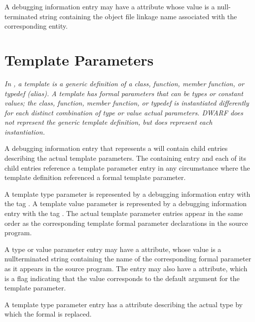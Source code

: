 A debugging information entry may have 
a 
\DWATlinkagename{}
attribute whose value is a null-terminated string containing the 
object file linkage name associated with the corresponding entity.


\section{Template Parameters}
\label{chap:templateparameters}
\textit{In , a template is a generic definition 
of a class, function, member function, or typedef (alias).  
A template has formal parameters that
can be types or constant values; the class, function,
member function, or typedef is instantiated differently for each
distinct combination of type or value actual parameters.  DWARF does
not represent the generic template definition, but does represent each
instantiation.}

A debugging information entry that represents a 
will contain child entries describing the actual template parameters.
The containing entry and each of its child entries reference a template
parameter entry in any circumstance where the template definition
referenced a formal template parameter.

A template type parameter is represented by a debugging information
entry with the tag
\DWTAGtemplatetypeparameterTARG. 
A template value parameter is represented by a debugging information
entry with the tag
\DWTAGtemplatevalueparameterTARG.
The actual template parameter entries appear in the same order as the 
corresponding template formal parameter declarations in the 
source program.

A type or value parameter entry may have a \DWATname{} attribute, 
whose value is a
null\dash terminated string containing the name of the corresponding 
formal parameter as it appears in the source program.
The entry may also have a 
\DWATdefaultvalue{} attribute, which is a flag indicating 
that the value corresponds to the default argument for the 
template parameter.

A
template type parameter entry has a
\DWATtype{} attribute
describing the actual type by which the formal is replaced.

